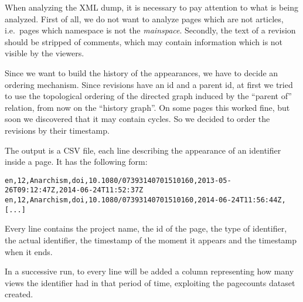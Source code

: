 When analyzing the XML dump, it is necessary to pay attention to what is being analyzed.
First of all, we do not want to analyze pages which are not articles, i.e.\ pages which namespace is not the \emph{mainspace}.
Secondly, the text of a revision should be stripped of comments, which may contain information which is not visible by the viewers.

Since we want to build the history of the appearances, we have to decide an ordering mechanism.
Since revisions have an id and a parent id, at first we tried to use the topological ordering of the directed graph induced by the ``parent of'' relation, from now on the ``history graph''.
On some pages this worked fine, but soon we discovered that it may contain cycles.
So we decided to order the revisions by their timestamp.

The output is a CSV file, each line describing the appearance of an identifier inside a page.
It has the following form:
\begin{verbatim}
en,12,Anarchism,doi,10.1080/07393140701510160,2013-05-26T09:12:47Z,2014-06-24T11:52:37Z
en,12,Anarchism,doi,10.1080/07393140701510160,2014-06-24T11:56:44Z,
[...]
\end{verbatim}
Every line contains the project name, the id of the page, the type of identifier, the actual identifier, the timestamp of the moment it appears and the timestamp when it ends.

In a successive run, to every line will be added a column representing how many views the identifier had in that period of time, exploiting the pagecounts dataset created.
